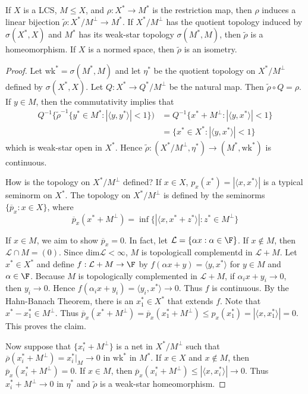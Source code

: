 \begin{thm}
    If $X$ is a LCS, $M \leq X$, and $\rho:X^*\rightarrow M^*$ is the restriction map, then $\rho$ induces a linear bijection $\widetilde{\rho}:X^*/M^{\perp}\rightarrow M^*$. If $X^*/M^{\perp}$ has the quotient topology induced by $\sigma(X^*,X)$ and $M^*$ has its weak-star topology $\sigma(M^*,M)$, then $\widetilde{\rho}$ is a homeomorphism. If $X$ is a normed space, then $\widetilde{\rho}$ is an isometry.
\end{thm}
\begin{proof}
    Let $\text{wk}^* = \sigma(M^*,M)$ and let $\eta^*$ be the quotient topology on $X^*/M^{\perp}$ defined by $\sigma(X^*,X)$. Let $Q:X^*\rightarrow Q^*/M^{\perp}$ be the natural map. Then $\widetilde{\rho} \circ Q = \rho$. If $y \in M$, then the commutativity implies that \begin{align*}
        Q^{-1}\{\widetilde{\rho}^{-1}\{y^*\in M^*:|\langle y,y^*\rangle| < 1\}) &= Q^{-1}\{x^*+M^{\perp}:|\langle y,x^*\rangle| < 1\} \\
        &= \{x^* \in X^*:|\langle y,x^*\rangle| < 1\}
    \end{align*}
    which is weak-star open in $X^*$. Hence $\widetilde{\rho}:(X^*/M^{\perp},\eta^*)\rightarrow (M^*,\text{wk}^*)$ is continuous.

    How is the topology on $X^*/M^{\perp}$ defined? If $x \in X$, $p_x(x^*) = |\langle x,x^*\rangle|$ is a typical seminorm on $X^*$. The topology on $X^*/M^{\perp}$ is defined by the seminorms $\{\overline{p}_x:x \in X\}$, where $$\overline{p}_x(x^*+M^{\perp}) = \inf\{|\langle x,x^*+z^*\rangle|:z^* \in M^{\perp}\}$$

    If $x \in M$, we aim to show $\overline{p}_x = 0$. In fact, let $\mathcal{L} = \{\alpha x:\alpha \in \F\}$. If $x \notin M$, then $\mathcal{L}\cap M = (0)$. Since $\text{dim}\mathcal{L} < \infty$, $M$ is topologicall complementd in $\mathcal{L}+M$. Let $x^* \in X^*$ and define $f:\mathcal{L}+M\rightarrow \F$ by $f(\alpha x+y) = \langle y,x^*\rangle$ for $y \in M$ and $\alpha \in \F$. Because $M$ is topologically complemented in $\mathcal{L}+M$, if $\alpha_ix+y_i\rightarrow 0$, then $y_i\rightarrow 0$. Hence $f(\alpha_ix+y_i)=\langle y_i,x^*\rangle \rightarrow 0$. Thus $f$ is continuous. By the Hahn-Banach Theorem, there is an $x_1^* \in X^*$ that extends $f$. Note that $x^* - x_1^* \in M^{\perp}$. Thus $\overline{p}_x(x^*+M^{\perp}) = \overline{p}_x(x_1^*+M^{\perp}) \leq p_x(x_1^*) = |\langle x,x_1^*\rangle | = 0$. This proves the claim.


    Now suppose that $\{x_i^*+M^{\perp}\}$ is a net in $X^*/M^{\perp}$ such that $\overline{\rho}(x_i^*+M^{\perp}) = x_i^*\vert_M\rightarrow 0$ in $\text{wk}^*$ in $M^*$. If $x \in X$ and $x \notin M$, then $\overline{p}_x(x_i^*+M^{\perp}) = 0$. If $x \in M$, then $\overline{p}_x(x_i^*+M^{\perp}) \leq |\langle x,x_i^*\rangle| \rightarrow 0$. Thus $x_i^*+M^{\perp}\rightarrow 0$ in $\eta^*$ and $\widetilde{\rho}$ is a weak-star homeomorphism.
\end{proof}


